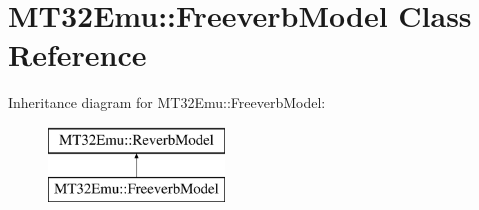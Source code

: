 \hypertarget{classMT32Emu_1_1FreeverbModel}{\section{M\-T32\-Emu\-:\-:Freeverb\-Model Class Reference}
\label{classMT32Emu_1_1FreeverbModel}
}
Inheritance diagram for M\-T32\-Emu\-:\-:Freeverb\-Model\-:\begin{figure}[H]
\begin{center}
\leavevmode
\includegraphics[height=2.000000cm]{classMT32Emu_1_1FreeverbModel}
\end{center}
\end{figure}
